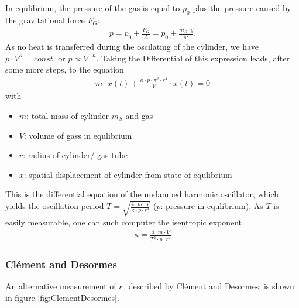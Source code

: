 \documentclass{subfiles}
\begin{document}
            \noindent In equlibrium, the pressure of the gas is equal to $p_0$ plus the pressure caused by the gravitational force $F_G$:
            \begin{align*}
                p=p_0+\frac{F_G}{A}=p_0+\frac{m_S\cdot g}{\pi^2}.
            \end{align*}
            As no heat is transferred during the oscilating of the cylinder, we have $p\cdot V^{\kappa}=const.$ or $p\propto V^{-\kappa}$. Taking the Differential of this expression leads, after some more steps, to the equation 
            \begin{align*}
                m\cdot \ddot x(t)+\frac{\kappa\cdot p\cdot \pi^2\cdot r^4}{V}\cdot x(t)=0
            \end{align*} 
            with
            \begin{itemize}
                \item $m$: total mass of cylinder $m_S$ and gas
                \item $V$: volume of gass in equlibrium
                \item $r$: radius of cylinder/ gas tube
                \item $x$: spatial displacement of cylinder from state of equlibrium
            \end{itemize}
            This is the differential equation of the undamped harmonic oscillator, which yields the oscillation period $T=\sqrt{\frac{4\cdot m\cdot V}{\kappa\cdot p\cdot r^4}}$ ($p$: pressure in equlibrium). As $T$ is easily measurable, one can such computer the isentropic exponent \cite[p.259-262]{skript}
            \begin{align*}
                \kappa=\frac{4\cdot m\cdot V}{T^2\cdot p\cdot r^4}
            \end{align*}

        \subsubsection*{Clément and Desormes}\label{sec:ClementDesormes}
            An alternative measurement of $\kappa$, described by Clément and Desormes, is shown in figure \ref{fig:ClementDesormes}.
            
\end{document}
